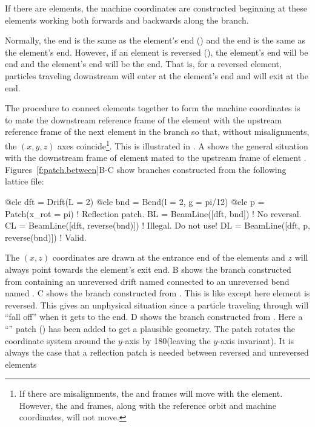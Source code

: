 If there are  elements, the machine coordinates are constructed beginning at these
elements working both forwards and backwards along the branch.

Normally, the  end is the same as the element's  end 
() and the
 end is the same as the element's  end. However, if an element is reversed
(), the element's  end will be  end and the element's
 end will be the  end. That is, for a reversed element, particles 
traveling downstream will
enter at the element's  end and will exit at the  end.

The procedure to connect elements together to form the machine coordinates is to mate the
downstream reference frame of the element with the upstream reference frame of the next element in
the branch so that, without misalignments, the $(x,y,z)$ axes coincide\footnote
  {
If there are misalignments, the  and  frames will move with the element. However,
the  and  frames, along with the reference orbit and machine
coordinates, will not move.
  }. 
This is illustrated in . A shows the general situation
with the downstream frame of element  mated to the upstream frame of element .
Figures~\ref{f:patch.between}B-C show branches constructed from the following lattice file:
\begin{example}
  @ele dft = Drift(L = 2)
  @ele bnd = Bend(l = 2, g = pi/12)
  @ele p = Patch(x_rot = pi)             ! Reflection patch.
  BL = BeamLine([dft, bnd])              ! No reversal.
  CL = BeamLine([dft, reverse(bnd)])     ! Illegal. Do not use!
  DL = BeamLine([dft, p, reverse(bnd)])  ! Valid.
\end{example}
The $(x,z)$ coordinates are drawn at the entrance end of the elements and $z$ will always point
towards the element's exit end.  B shows the branch constructed from
 containing an unreversed drift named  connected to an unreversed bend named
. C shows the branch constructed from . This is like
 except here element  is reversed. This gives an unphysical situation since a
particle traveling through  will ``fall off'' when it gets to the end.
D shows the branch constructed from . Here a ``''
patch  () has been added to get a plausible geometry. The patch rotates the
coordinate system around the $y$-axis by 180\Deg (leaving the $y$-axis invariant). It is always the
case that a reflection patch is needed between reversed and unreversed elements

